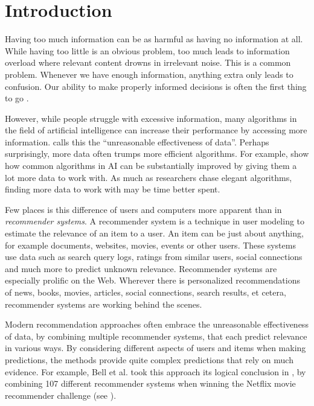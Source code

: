 \section{Introduction}
\label{sec:intro}

Having too much information can be as harmful as having no information at all.
While having too little is an obvious problem,
too much leads to information overload where relevant content drowns in irrelevant noise.
This is a common problem. Whenever we have enough information,
anything extra only leads to confusion.
Our ability to make properly informed decisions is often the first thing to go
\cite[p1]{Davenport2001}.

However, while people struggle with excessive information,
many algorithms in the field of artificial intelligence
can increase their performance by accessing more information.
\cite[p1]{Halevy2009} calls this the ``unreasonable effectiveness of data''.
Perhaps surprisingly, more data often trumps more efficient algorithms.
For example, \cite[p3]{Banko2001} show how common algorithms in AI 
can be substantially improved by giving them a lot more data to work with.
As much as researchers chase elegant algorithms, finding more data to work with may be time better spent.

Few places is this difference of users and computers more apparent than in \emph{recommender systems}.
A recommender system is a technique in user modeling to estimate the relevance of an item to a user.
An item can be just about anything, for example documents, websites, movies, events or other users.
These systems use data such as search query logs, 
ratings from similar users, social connections and much more
to predict unknown relevance.
Recommender systems are especially prolific on the Web. 
Wherever there is personalized recommendations of news, books, movies,
articles, social connections, search results, et cetera, recommender systems are working behind the scenes.

Modern recommendation approaches often embrace the 
unreasonable effectiveness of data,
by combining multiple recommender systems, that each predict relevance in various ways.
By considering different aspects of users and items when making predictions,
the methods provide quite complex predictions that rely on much evidence.
For example, Bell et al. took this approach its logical conclusion in \cite{Bell2007}, by 
combining 107 different recommender systems when winning the 
Netflix movie recommender challenge
(see \cite{Linden2009}).

